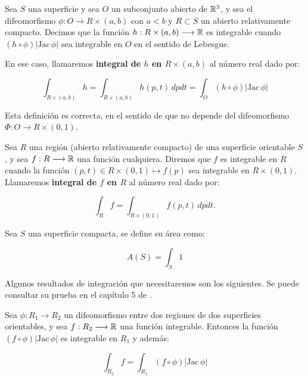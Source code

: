 \begin{definition}
Sea $S$ una superficie y sea $O$ un subconjunto abierto de $\mathbb{R}^3$, y sea el difeomorfismo $\phi: O \longrightarrow R \times (a,b)$ con $a < b$ y $R \subset S$ un abierto relativamente compacto. Decimos que la función $h: R \times (a,b) \longrightarrow \mathbb{R}$ es integrable cuando $(h \circ \phi)|\text{Jac} \, \phi|$ sea integrable en $O$ en el sentido de Lebesgue.

En ese caso, llamaremos \textbf{integral de $h$ en $R \times (a,b)$} al número real dado por:

\begin{equation*}
    \int_{R \times (a,b)} h = \int_{R \times (a,b)} h(p, t) \, dp dt = \int_{O} (h \circ \phi)|\text{Jac} \, \phi|
\end{equation*}
\end{definition}

Esta definición es correcta, en el sentido de que no depende del difeomorfismo $\Phi: O \longrightarrow R \times (0,1)$.

\begin{definition}[Integral en $S$]
Sea $R$ una región (abierto relativamente compacto) de una superficie orientable $S$, y sea $f:R \longrightarrow \mathbb{R}$ una función cualquiera. Diremos que $f$ es integrable en $R$ cuando la función $(p,t) \in R \times (0,1) \mapsto f(p)$ sea integrable en $R \times (0,1)$. Llamaremos \textbf{integral de $f$ en $R$} al número real dado por:

\begin{equation*}
    \int_{R} f = \int_{R \times (0,1)} f(p,t) \, dp dt.
\end{equation*}
\end{definition}

\begin{definition}
Sea $S$ una superficie compacta, se define su área como:

\begin{equation*}
    A(S) = \int_S 1
\end{equation*}
\end{definition}

Algunos resultados de integración que necesitaremos son los siguientes. Se puede consultar su prueba en el capítulo 5 de \cite{montielrosbook}.

\begin{theorem}
Sea $\phi:R_1 \longrightarrow R_2$ un difeomorfismo entre dos regiones de dos superficies orientables, y sea $f: R_2 \longrightarrow \mathbb{R}$ una función integrable. Entonces la función $(f \circ \phi)|\text{Jac} \, \phi|$ es integrable en $R_1$ y además:

\begin{equation*}
    \int_{R_2} f = \int_{R_1} (f \circ \phi)|\text{Jac} \, \phi|
\end{equation*}
\end{theorem}

